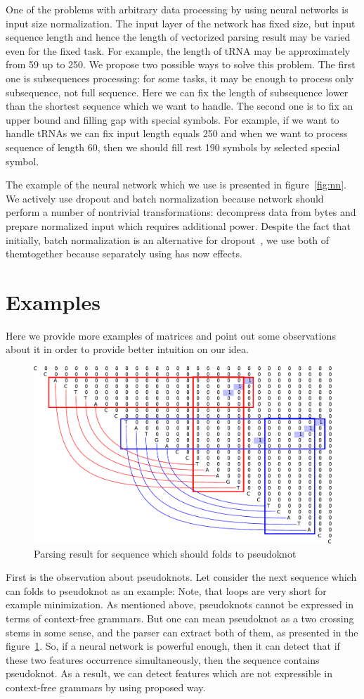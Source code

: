 \documentclass[a4paper,twoside]{article}
\begin{document}
One of the problems with arbitrary data processing by using neural networks is input size normalization.
The input layer of the network has fixed size, but input sequence length and hence the length of vectorized parsing result may be varied even for the fixed task.
For example, the length of tRNA may be approximately from 59 up to 250.
We propose two possible ways to solve this problem.
The first one is subsequences processing: for some tasks, it may be enough to process only subsequence, not full sequence.
Here we can fix the length of subsequence lower than the shortest sequence which we want to handle. 
The second one is to fix an upper bound and filling gap with special symbols.
For example, if we want to handle tRNAs we can fix input length equals 250 and when we want to process sequence of length 60, then we should fill rest 190 symbols by selected special symbol.

The example of the neural network which we use is presented in figure~\ref{fig:nn}.
We actively use dropout and batch normalization because network should perform a number of nontrivial transformations: decompress data from bytes and prepare normalized input which requires additional power.
Despite the fact that initially, batch normalization is an alternative for dropout~\cite{DBLP:journals:corr:IoffeS15}, we use both of themtogether because separately using has now effects.

\section{Examples}
\label{sec:examples}

\noindent Here we provide more examples of matrices and point out some observations about it in order to provide better intuition on our idea.

\begin{figure}
\centering
\includegraphics[width=.45\textwidth]{figures/5.pdf}
\caption{Parsing result for sequence which should folds to pseudoknot}
\label{fig:pseudoknot}
\end{figure}

First is the observation about pseudoknots. 
Let consider the next sequence which can folds to pseudoknot as an example: {}
Note, that loops are very short for example minimization.
As mentioned above, pseudoknots cannot be expressed in terms of context-free grammars. 
But one can mean pseudoknot as a two crossing stems in some sense, and the parser can extract both of them, as presented in the figure~\ref{fig:pseudoknot}.
So, if a neural network is powerful enough, then it can detect that if these two features occurrence simultaneously, then the sequence contains pseudoknot.
As a result, we can detect features which are not expressible in context-free grammars by using proposed way.
\end{document}
